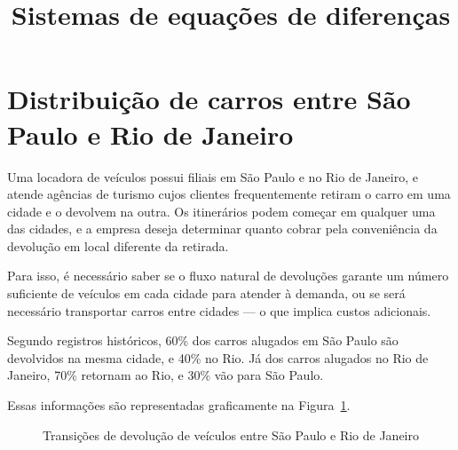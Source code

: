 \documentclass{article}
\begin{document}
\title{Sistemas de equações de diferenças}
\date{}


\maketitle


\section*{Distribuição de carros entre São Paulo e Rio de Janeiro}



Uma locadora de veículos possui filiais em São Paulo e no Rio de
Janeiro, e atende agências de turismo cujos clientes frequentemente
retiram o carro em uma cidade e o devolvem na outra. Os itinerários
podem começar em qualquer uma das cidades, e a empresa deseja
determinar quanto cobrar pela conveniência da devolução em local
diferente da retirada.

Para isso, é necessário saber se o fluxo natural de devoluções garante
um número suficiente de veículos em cada cidade para atender à demanda,
ou se será necessário transportar carros entre cidades — o que implica
custos adicionais.

Segundo registros históricos, 60\% dos carros alugados em São Paulo são
devolvidos na mesma cidade, e 40\% no Rio. Já dos carros alugados no
Rio de Janeiro, 70\% retornam ao Rio, e 30\% vão para São Paulo.

\bigskip

Essas informações são representadas graficamente na
Figura~\ref{fig:transicoes}.


\begin{figure}[h!]
\centering
{}
\caption{Transições de devolução de veículos entre São Paulo e Rio de
  Janeiro}
\label{fig:transicoes}
\end{figure}
\end{document}
